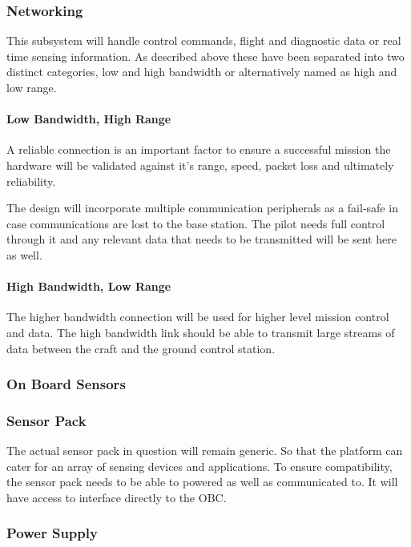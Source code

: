 			\subsubsection{Networking}
			This subsystem will handle control commands, flight and diagnostic data or real time sensing information. As described above these have been separated into two distinct categories, low and high bandwidth or alternatively named as high and low range. 
			
				\paragraph{Low Bandwidth, High Range}
				A reliable connection is an important factor to ensure a successful mission the hardware will be validated against it's range, speed, packet loss and ultimately reliability.
						
				The design will incorporate multiple communication peripherals as a fail-safe in case communications are lost to the base station. The pilot needs full control through it and any relevant data that needs to be transmitted will be sent here as well.
						
				\paragraph{High Bandwidth, Low Range}
				The higher bandwidth connection will be used for higher level mission control and data. The high bandwidth link should be able to transmit large streams of data between the craft and the ground control station. 
	
			
			\subsubsection{On Board Sensors}
			
			
			\subsubsection{Sensor Pack}
			The actual sensor pack in question will remain generic. So that the platform can cater for an array of sensing devices and applications. To ensure compatibility, the sensor pack needs to be able to powered as well as communicated to. It will have access to interface directly to the OBC.
	
	
			\subsubsection{Power Supply}
